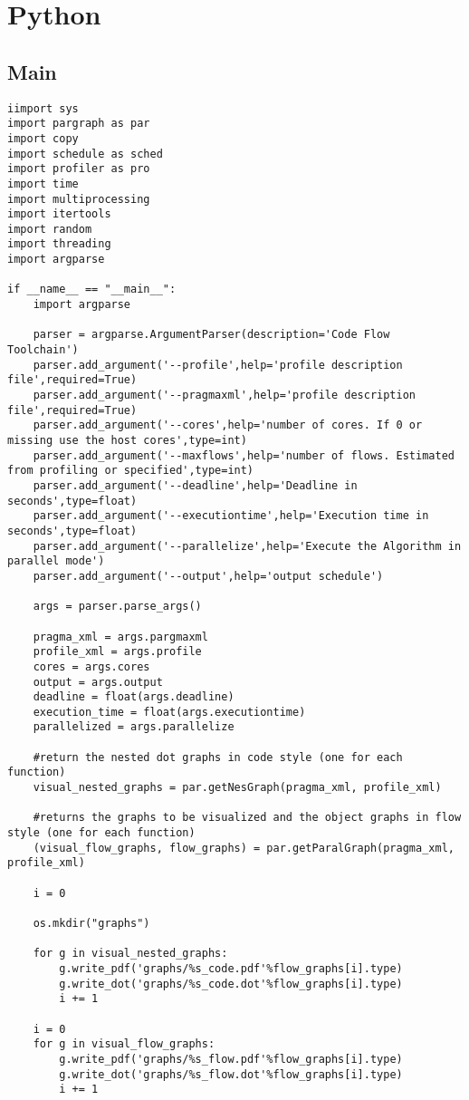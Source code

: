 \documentclass[a4paper,10pt,twoside]{book}
\begin{document}
\chapter{Python}
\section{Main}
\begin{lstlisting}[language=CCC, caption=appsched.py]
iimport sys
import pargraph as par
import copy
import schedule as sched
import profiler as pro
import time
import multiprocessing
import itertools
import random
import threading
import argparse

if __name__ == "__main__":
	import argparse

	parser = argparse.ArgumentParser(description='Code Flow Toolchain')
	parser.add_argument('--profile',help='profile description file',required=True)
	parser.add_argument('--pragmaxml',help='profile description file',required=True)
	parser.add_argument('--cores',help='number of cores. If 0 or missing use the host cores',type=int)
	parser.add_argument('--maxflows',help='number of flows. Estimated from profiling or specified',type=int)
	parser.add_argument('--deadline',help='Deadline in seconds',type=float)
	parser.add_argument('--executiontime',help='Execution time in seconds',type=float)
	parser.add_argument('--parallelize',help='Execute the Algorithm in parallel mode')
	parser.add_argument('--output',help='output schedule')

	args = parser.parse_args()

	pragma_xml = args.pargmaxml
	profile_xml = args.profile
	cores = args.cores
	output = args.output
	deadline = float(args.deadline)
	execution_time = float(args.executiontime)
	parallelized = args.parallelize
	
	#return the nested dot graphs in code style (one for each function)
	visual_nested_graphs = par.getNesGraph(pragma_xml, profile_xml)

	#returns the graphs to be visualized and the object graphs in flow style (one for each function)
	(visual_flow_graphs, flow_graphs) = par.getParalGraph(pragma_xml, profile_xml) 

	i = 0

	os.mkdir("graphs")

	for g in visual_nested_graphs:
		g.write_pdf('graphs/%s_code.pdf'%flow_graphs[i].type)
		g.write_dot('graphs/%s_code.dot'%flow_graphs[i].type)
		i += 1

	i = 0
	for g in visual_flow_graphs:
		g.write_pdf('graphs/%s_flow.pdf'%flow_graphs[i].type)
		g.write_dot('graphs/%s_flow.dot'%flow_graphs[i].type)
		i += 1


\end{lstlisting}
\end{document}
